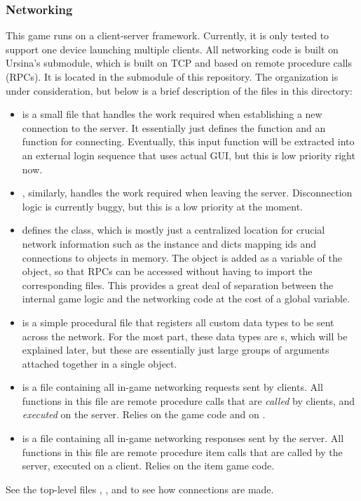 \documentclass{article}
\begin{document}
\subsubsection{Networking}
This game runs on a client-server framework. Currently, it is only tested to
support one device launching multiple clients.
All networking code is built on Ursina's  submodule, which
is built on TCP and based on remote procedure calls (RPCs). It is located in
the  submodule of this repository. The organization is
under consideration, but below is a brief description of the files in this
directory:
\begin{itemize}
    \item {} is a small file that handles the work required
        when establishing a new connection to the server. It essentially just
        defines the  function and an 
        function for connecting. Eventually, this input function will be
        extracted into an external login sequence that uses actual GUI,
        but this is low priority right now.
    \item {}, similarly, handles the work required when
        leaving the server. Disconnection logic is currently buggy, but this
        is a low priority at the moment.
    \item {} defines the  class, which is
        mostly just a centralized location for crucial network information
        such as the  instance and dicts mapping ids and connections
        to objects in memory. The  object is added as a
        variable of the  object, so that RPCs can be accessed
        without having to import the corresponding files. This provides a great
        deal of separation between the internal game logic and the networking
        code at the cost of a global variable.
    \item {} is a simple procedural file that registers all
        custom data types to be sent across the network. For the most part, these
        data types are s, which will be explained later, but these
        are essentially just large groups of arguments attached together in a single
        object.
    \item {} is a file containing all in-game networking
        requests sent by clients. All functions in this file are remote procedure
        calls that are {\it called} by clients, and {\it executed} on the server.
        Relies on the game code and on .
    \item {} is a file containing all in-game networking
        responses sent by the server. All functions in this file are remote procedure
        item calls that are called by the server, executed on a client. Relies on the
        item game code.
\end{itemize}
See the top-level files , , and
 to see how connections are made.
\end{document}
